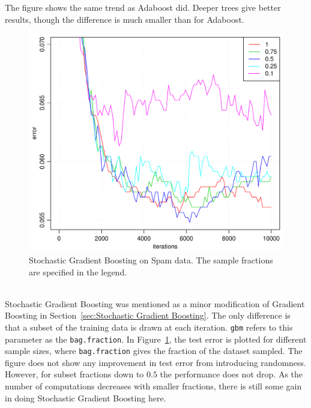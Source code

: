The figure shows the same trend as Adaboost did. Deeper trees give better results, though the difference is much smaller than for Adaboost.
\\
%
\begin{figure}[htbp]
\begin{center}
    \includegraphics[scale=0.5]{./figures/gradboostSpamStoch.pdf}
\end{center}
\caption{Stochastic Gradient Boosting on Spam data. The sample fractions are specified in the legend.}
\label{fig:StochasticGradBoost}
\end{figure}
\\
Stochastic Gradient Boosting was mentioned as a minor modification of Gradient Boosting in Section~\ref{sec:Stochastic Gradient Boosting}. The only difference is that a subset of the training data is drawn at each iteration. \verb+gbm+ refers to this parameter as the \verb+bag.fraction+. In Figure~\ref{fig:StochasticGradBoost}, the test error is plotted for different sample sizes, where \verb+bag.fraction+ gives the fraction of the dataset sampled. The figure does not show any improvement in test error from introducing randomness. However, for subset fractions down to $0.5$ the performance does not drop. As the number of computations decreases with smaller fractions, there is still some gain in doing Stochastic Gradient Boosting here.


